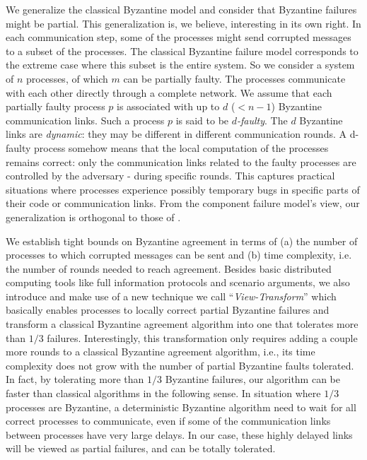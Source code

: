 \documentclass[11pt,conference,compsoc,onecolumn,romanappendices]{IEEEtran}
\newcommand{\tmem}[1]{{\em #1\/}}
\begin{document}
We generalize the classical Byzantine model and
consider that Byzantine failures might be partial. This generalization is, we
believe, interesting in its own right.  In each communication step, some of
the processes might send corrupted messages to a subset of the processes.
The classical Byzantine failure model corresponds to the extreme case  where
this subset is the entire system.  So we consider a system of $n$ processes,
of which  $m$ can be partially faulty.  The processes communicate with each
other directly through a complete network. We assume that each partially
faulty process $p$ is associated with up
to $d$ ($< n - 1$) Byzantine communication links. Such a process $p$ is said to be
{\tmem{$d$-faulty}}. The $d$ Byzantine links are {\tmem{dynamic}}: they may
be different in different communication rounds.
A d-faulty process
somehow means that the local computation of the processes remains correct:
only the communication links related to the faulty processes are
controlled by the adversary - during specific rounds.  This captures practical
situations where processes experience possibly temporary bugs in specific
parts of their code or communication links.
From the component failure model's
view, our generalization is orthogonal to those of
{\cite{tseng2013iterative,santoro2007agreement,amitanand2003distributed}}.


We establish tight bounds on Byzantine agreement in terms of (a) the number of
processes to which corrupted messages can be sent and (b) time complexity,
i.e. the number of rounds needed to reach agreement. Besides basic distributed
computing tools like full information protocols and scenario arguments, we
also introduce and make  use of a new technique we call ``\tmem{View-Transform}'' which
basically enables processes to locally correct partial Byzantine failures
and transform  a classical Byzantine agreement algorithm  into one
that tolerates more than $1/3$ failures. Interestingly, this transformation only
requires  adding a couple more rounds to a classical Byzantine agreement
algorithm, i.e., its time complexity does not grow with the  number of partial
Byzantine faults tolerated.
In fact, by tolerating more than $1/3$ Byzantine failures, our algorithm can
be faster than classical algorithms in the following sense.
In situation where $1/3$ processes are Byzantine, a deterministic
Byzantine algorithm \cite{lamport1982byzantine} need to wait for all correct
processes to communicate, even if some of the communication links between processes
have very large delays.
In our case, these highly delayed links will be viewed as partial failures, and can be totally tolerated.
\end{document}
